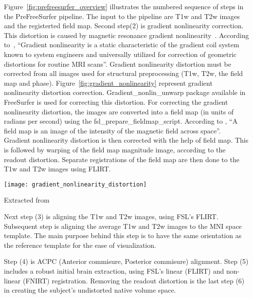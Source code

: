 \indent Figure~\ref{fig:prefreesurfer_overview} illustrates the numbered sequence of steps in the PreFreeSurfer pipeline. The input to the pipeline are T1w and T2w images and the registerted field map. Second step(2) is gradient nonlinearity correction. This distortion is caused by magnetic resonance gradient nonlinearity~\cite{Gla13}. According to~\cite{Zou2004}, ``Gradient nonlinearity is a static characteristic of the gradient coil system known to system engineers and universally utilized for correction of geometric distortions for routine MRI scans''. Gradient nonlinearity distortion must be corrected from all images used for structural preprocessing (T1w, T2w, the field map and phase). Figure~\ref{fig:gradient_nonlinearity} represent gradient nonlinearity distortion correction. Gradient\_nonlin\_unwarp package available in FreeSurfer is used for correcting this distortion. For correcting the gradient nonlinearity distortion, the images are converted into a field map (in units of radians per second) using the fsl\_prepare\_fieldmap\_script. According to \cite{field_map}, ``A field map is an image of the intensity of the magnetic field across space''. Gradient nonlinearity distortion is then corrected with the help of field map. This is followed by warping of the field map magnitude image, according to the readout distortion. Separate registrations of the field map are then done to the T1w and T2w images using FLIRT.

\begin{center}
  \texttt{[image: gradient\_nonlinearity\_distortion]}
  \label{fig:gradient_nonlinearity}
  \caption*{Extracted from \cite{Gla13}}
\end{center}

\indent Next step (3) is aligning the T1w and T2w images, using FSL's FLIRT. Subsequent step is aligning the average T1w and T2w images to the MNI space template. The main purpose behind this step is to have the same orientation as the reference template for the ease of visualization.

\indent Step (4) is ACPC (Anterior commisure, Posterior commisure) alignment. Step (5) includes a robust initial brain extraction, using FSL's linear (FLIRT) and non-linear (FNIRT) registration. Removing the readout distortion is the last step (6) in creating the subject's undistorted native volume space. %

